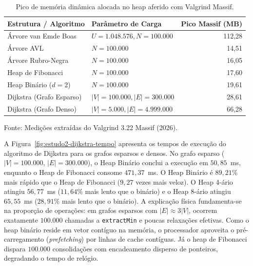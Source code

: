 \documentclass[12pt,a4paper]{report}
\begin{document}
\begin{table}[htbp]
  \centering
  \caption{Pico de memória dinâmica alocada no heap aferido com Valgrind Massif.}
  \label{tab:valgrind-massif}
  \begin{tabular}{llr}
    \toprule
    \textbf{Estrutura / Algoritmo} & \textbf{Parâmetro de Carga} & \textbf{Pico Massif (MB)} \\
    \midrule
    Árvore van Emde Boas & $U = 1.048.576, N = 100.000$ & 112,28 \\
    Árvore AVL & $N = 100.000$ & 14,51 \\
    Árvore Rubro-Negra & $N = 100.000$ & 16,05 \\
    Heap de Fibonacci & $N = 100.000$ & 17,60 \\
    Heap Binário ($d=2$) & $N = 100.000$ & 19,61 \\
    Dijkstra (Grafo Esparso) & $|V|=100.000, |E|=300.000$ & 28,61 \\
    Dijkstra (Grafo Denso) & $|V|=5.000, |E|=4.999.000$ & 66,28 \\
    \bottomrule
  \end{tabular}
  \vspace{0.2cm}
  
  \raggedright\footnotesize Fonte: Medições extraídas do Valgrind 3.22 Massif (2026).
\end{table}

A Figura~\ref{fig:estudo2-dijkstra-tempo} apresenta os tempos de execução do algoritmo de Dijkstra para os grafos esparsos e densos. No grafo esparso ($|V| = 100.000$, $|E| = 300.000$), o Heap Binário conclui a execução em $50{,}85$~ms, enquanto o Heap de Fibonacci consome $471{,}37$~ms. O Heap Binário é $89{,}21\%$ mais rápido que o Heap de Fibonacci ($9{,}27$ vezes mais veloz). O Heap 4-ário atingiu $56{,}77$~ms ($11{,}64\%$ mais lento que o binário) e o Heap 8-ário atingiu $65{,}55$~ms ($28{,}91\%$ mais lento que o binário). A explicação física fundamenta-se na proporção de operações: em grafos esparsos com $|E| \approx 3|V|$, ocorrem exatamente $100.000$ chamadas a \texttt{extractMin} e poucas relaxações efetivas. Como o heap binário reside em vetor contíguo na memória, o processador aproveita o pré-carregamento (\textit{prefetching}) por linhas de cache contíguas. Já o heap de Fibonacci dispara $100.000$ consolidações com encadeamento disperso de ponteiros, degradando o tempo de relógio.
\end{document}

